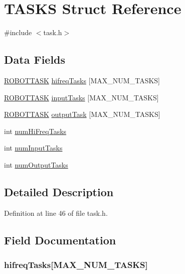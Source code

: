 \hypertarget{struct_t_a_s_k_s}{
\section{TASKS Struct Reference}
\label{struct_t_a_s_k_s}
}


{\ttfamily \#include $<$task.h$>$}

\subsection*{Data Fields}
\begin{DoxyCompactItemize}
\item 
\hyperlink{struct_r_o_b_o_t_t_a_s_k}{ROBOTTASK} \hyperlink{struct_t_a_s_k_s_a7b41518977698f1edd6ad95ff7595028}{hifreqTasks} \mbox{[}MAX\_\-NUM\_\-TASKS\mbox{]}
\item 
\hyperlink{struct_r_o_b_o_t_t_a_s_k}{ROBOTTASK} \hyperlink{struct_t_a_s_k_s_a4d918bead167ab6fc72ed48fae20dcbc}{inputTasks} \mbox{[}MAX\_\-NUM\_\-TASKS\mbox{]}
\item 
\hyperlink{struct_r_o_b_o_t_t_a_s_k}{ROBOTTASK} \hyperlink{struct_t_a_s_k_s_accec851bb1a610fff25b5c3a49cc10c0}{outputTask} \mbox{[}MAX\_\-NUM\_\-TASKS\mbox{]}
\item 
int \hyperlink{struct_t_a_s_k_s_a5eadb4e03834b57f982a7dae230074c7}{numHiFreqTasks}
\item 
int \hyperlink{struct_t_a_s_k_s_a8db3ae4e645f876a98a76a901ebb4ac6}{numInputTasks}
\item 
int \hyperlink{struct_t_a_s_k_s_a1d2d6944f7d3fe57ac9b7bf7959af091}{numOutputTasks}
\end{DoxyCompactItemize}


\subsection{Detailed Description}


Definition at line 46 of file task.h.



\subsection{Field Documentation}
\hypertarget{struct_t_a_s_k_s_a7b41518977698f1edd6ad95ff7595028}{
\subsubsection[{hifreqTasks}]{ {\bf hifreqTasks}\mbox{[}MAX\_\-NUM\_\-TASKS\mbox{]}}}
\label{struct_t_a_s_k_s_a7b41518977698f1edd6ad95ff7595028}


